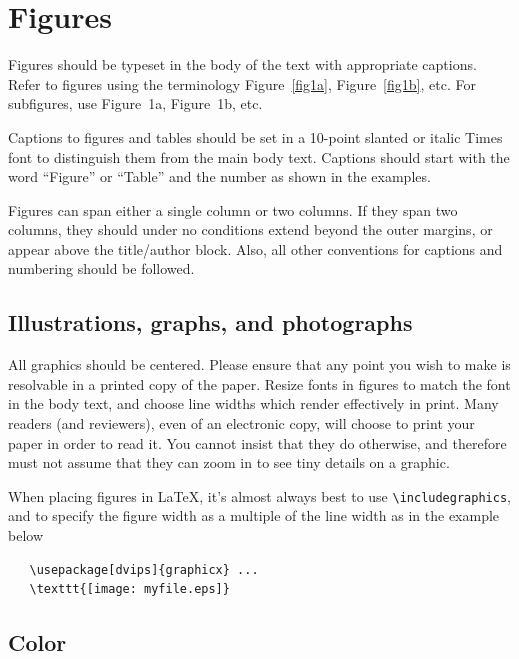 \documentclass[10pt,twocolumn,letterpaper]{article}
\begin{document}
\section{Figures}

Figures should be typeset in the body of the text with appropriate
captions.   
Refer to figures using the terminology Figure~\ref{fig1a}, 
Figure~\ref{fig1b}, etc.    For subfigures, use Figure~1a, Figure~1b, etc.

Captions to figures and tables should be set in a 10-point slanted or italic
Times font to distinguish them from the main body text.   Captions should
start with the word ``Figure'' or ``Table'' and the number as shown in 
the examples.

Figures can span either a single column or two columns.   If they
span two columns, they should under no conditions extend
beyond the outer margins, or appear above the title/author block.   
Also, all other conventions for
captions and numbering should be followed.



\subsection{Illustrations, graphs, and photographs}

All graphics should be centered.  Please ensure that any point you wish to
make is resolvable in a printed copy of the paper.  Resize fonts in figures
to match the font in the body text, and choose line widths which render
effectively in print.  Many readers (and reviewers), even of an electronic
copy, will choose to print your paper in order to read it.  You cannot
insist that they do otherwise, and therefore must not assume that they can
zoom in to see tiny details on a graphic.

When placing figures in \LaTeX, it's almost always best to use 
\verb+\includegraphics+, and to specify the  figure width as a multiple of
the line width as in the example below
{\small\begin{verbatim}
   \usepackage[dvips]{graphicx} ... 
   \texttt{[image: myfile.eps]} 
\end{verbatim}
}


\subsection{Color}
\end{document}
